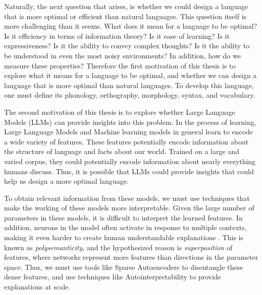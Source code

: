 Naturally, the next question that arises, is whether we could design a language that is more optimal or efficient than natural languages.
This question itself is more challenging than it seems. What does it mean for a language to be optimal? Is it efficiency in terms of information theory?
Is it ease of learning? Is it expressiveness? Is it the ability to convey complex thoughts? Is it the ability to be understood in even the most 
noisy environments? In addition, how do we measure these properties? Therefore the first motivation of this thesis is to explore what it means 
for a language to be optimal, and whether we can design a language that is more optimal than natural languages. To develop this language, one 
must define its phonology, orthography, morphology, syntax, and vocabulary.

The second motivation of this thesis is to explore whether Large Language Models (LLMs) can provide insights into this problem. In the process 
of learning, Large Language Models and Machine learning models in general learn to encode a wide variety of features. These features potentially encode
information about the structure of language and facts about our world. Trained on a large and varied corpus, they could potentially encode information
about nearly everything humans discuss. Thus, it is possible that LLMs could provide insights that could help us design a more optimal language.

To obtain relevant information from these models, we must use techniques that make the working of these models more interpretable.
Given the large number of parameters in these models, it is difficult to interpret the learned features. In addition, neurons in the model often 
activate in  response to multiple contexts, making it even harder to create human understandable explanations \cite{elhage2022superposition}.  
This is known as \textit{polysemanticity}, and the hypothesized reason is \textit{superposition} of features, where networks represent more features
than directions in the parameter space. Thus, we must use tools like Sparse Autoencoders \cite{cunninghamSparseAutoencodersFind2023} to 
disentangle these dense features, and use techniques like Autointerpretability \cite{billsLanguageModelsCan} to provide explanations at scale.



